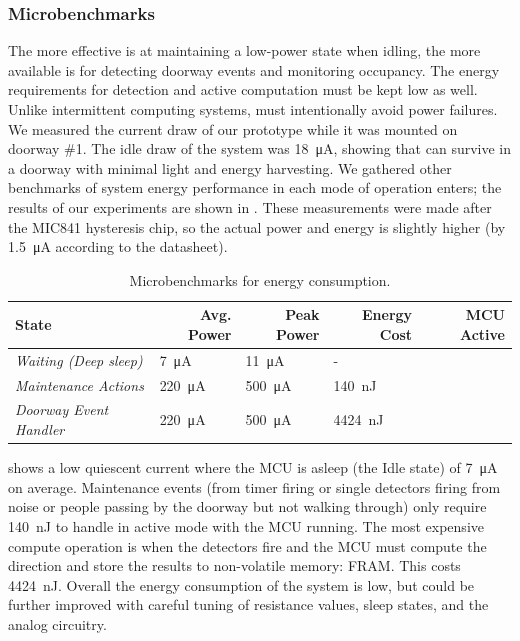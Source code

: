 \subsubsection{Microbenchmarks}
\label{sec:microbenchmarks}
The more effective \sysname is at maintaining a low-power state when idling, the more available \sysname is for detecting doorway events and monitoring occupancy.
The energy requirements for detection and active computation must be kept low as well.
Unlike intermittent computing systems, \sysname must intentionally avoid power failures.
We measured the current draw of our \sysname prototype while it was mounted on doorway \#1.
The idle draw of the system was \SI{18}{\micro\ampere}, showing that \sysname can survive in a doorway with minimal light and energy harvesting.
We gathered other benchmarks of system energy performance in each mode of operation \sysname enters; the results of our experiments are shown in . These measurements were made after the MIC841 hysteresis chip, so the actual power and energy is slightly higher (by \SI{1.5}{\micro\ampere} according to the datasheet).


%
\begin{table}[t]
\footnotesize
\begin{tabular}{@{}p{1.4in}lllc@{}}
\toprule
\textbf{State}          & \multicolumn{1}{r}{\textbf{Avg. Power}} & \multicolumn{1}{r}{\textbf{Peak Power}} & \multicolumn{1}{r}{\textbf{Energy Cost}} & \multicolumn{1}{r}{\textbf{MCU Active}} \\ \midrule
\textit{Waiting (Deep sleep)}       	& \SI{7}{\micro\ampere}	&  \SI{11}{\micro\ampere}	& - & \textcolor{magenta}{\xmark} \\
\textit{Maintenance Actions} & \SI{220}{\micro\ampere}	& \SI{500}{\micro\ampere}	& \SI{140}{\nano\joule}	 & \textcolor{green}{\cmark} \\
\textit{Doorway Event Handler} & \SI{220}{\micro\ampere}	& \SI{500}{\micro\ampere}	&  \SI{4424}{\nano\joule}     & \textcolor{green}{\cmark} \\ \midrule
\end{tabular}
\caption{Microbenchmarks for \sysname energy consumption.}
\label{tab:microbenchmarks}
\end{table}


 shows a low quiescent current where the MCU is asleep (the Idle state) of \SI{7}{\micro\ampere} on average. Maintenance events (from timer firing or single detectors firing from noise or people passing by the doorway but not walking through) only require \SI{140}{\nano\joule} to handle in active mode with the MCU running.
The most expensive compute operation is when the detectors fire and the MCU must compute the direction and store the results to non-volatile memory: FRAM. This costs \SI{4424}{\nano\joule}.
Overall the energy consumption of the system is low, but could be further improved with careful tuning of resistance values, sleep states, and the analog circuitry.

